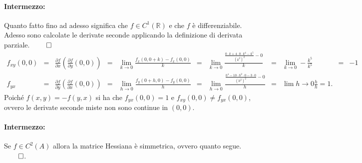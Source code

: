\begin{example}
	\paragraph{Intermezzo:} Quanto fatto fino ad adesso significa che $f\in C^1(\mathbb{R})$ e che $f$ è differenziabile. Adesso sono calcolate le derivate seconde applicando la definizione di derivata parziale. $\qed$
	\begin{equation*}
		\begin{matrix}
			f_{xy}(0,0) &=& \frac{\partial f}{\partial x}\left(\frac{\partial f}{\partial y}(0,0)\right) &=& \lim\limits_{k\rightarrow0}\frac{f_x(0,0+k)-f_x(0,0)}{k} &=& \lim\limits_{k\rightarrow 0}\frac{\frac{0\cdot k+4\cdot0\cdot k^4-k^5}{(k^2)^2} - 0}{k} &=&\lim\limits_{k\rightarrow0}-\frac{k^5}{k^5} &=& -1\\
			f_{yx} &=& \frac{\partial f}{\partial y}\left(\frac{\partial f}{\partial x}(0,0)\right) &=& \lim\limits_{h\rightarrow 0} \frac{f_y(0+h, 0)-f_y(0,0)}{h} &=& \lim\limits_{h\rightarrow 0}\frac{\frac{h^4 -10\cdot h^2\cdot 0 - 3\cdot 0}{(h^2)^2} - 0}{h} &=&\lim\limits{h\rightarrow 0}\frac{h}{h} = 1.
		\end{matrix}
	\end{equation*}
	Poiché $f(x,y)=-f(y,x)$ si ha che $f_{yx}(0,0) = 1$ e $f_{xy}(0,0)\neq f_{yx}(0,0)$, ovvero le derivate seconde miste non sono continue in $(0,0)$.
	\paragraph{Intermezzo:} Se $f\in C^2(A)$ allora la matrice Hessiana è simmetrica, ovvero quanto segue. $\qed$.
\end{example}

